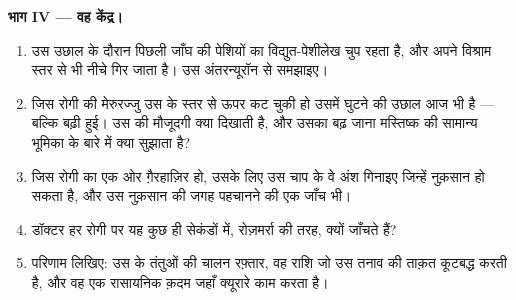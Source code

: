 \begin{problem}
\medskip
\noindent\textbf{भाग IV --- वह केंद्र।}
\begin{enumerate}[resume]
  \item उस उछाल के दौरान पिछली जाँघ की पेशियों का विद्युत-पेशीलेख चुप रहता
        है, और अपने विश्राम स्तर से भी नीचे गिर जाता है। उस अंतरन्यूरॉन से
        समझाइए।
  \item जिस रोगी की मेरुरज्जु उस  के स्तर से ऊपर कट चुकी हो उसमें
        घुटने की उछाल आज भी है --- बल्कि बढ़ी हुई। उस  की मौजूदगी
        क्या दिखाती है, और उसका बढ़ जाना मस्तिष्क की सामान्य भूमिका के बारे
        में क्या सुझाता है?
  \item जिस रोगी का  एक ओर ग़ैरहाज़िर हो, उसके लिए उस चाप के वे
        अंश गिनाइए जिन्हें नुक़सान हो सकता है, और उस नुक़सान की जगह पहचानने
        की एक जाँच भी।
  \item डॉक्टर हर रोगी पर यह  कुछ ही सेकंडों में, रोज़मर्रा की तरह,
        क्यों जाँचते हैं?
  \item परिणाम लिखिए: उस  के तंतुओं की चालन रफ़्तार, वह राशि जो उस
        तनाव की ताक़त कूटबद्ध करती है, और वह एक रासायनिक क़दम जहाँ क्यूरारे
        काम करता है।
\end{enumerate}
\end{problem}
